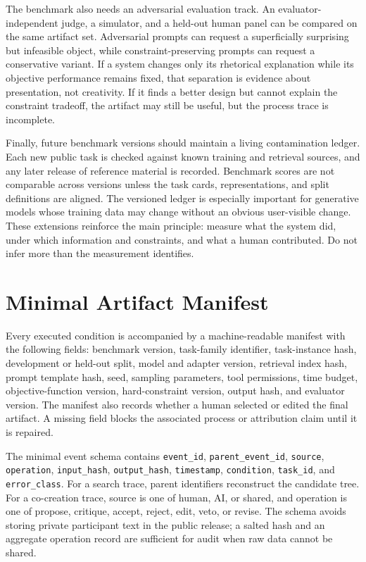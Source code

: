 \documentclass[conference]{IEEEtran}
\begin{document}
The benchmark also needs an adversarial evaluation track. An evaluator-independent
judge, a simulator, and a held-out human panel can be compared on the same artifact set.
Adversarial prompts can request a superficially surprising but infeasible object, while
constraint-preserving prompts can request a conservative variant. If a system changes
only its rhetorical explanation while its objective performance remains fixed, that
separation is evidence about presentation, not creativity. If it finds a better design
but cannot explain the constraint tradeoff, the artifact may still be useful, but the
process trace is incomplete.

Finally, future benchmark versions should maintain a living contamination ledger. Each
new public task is checked against known training and retrieval sources, and any later
release of reference material is recorded. Benchmark scores are not comparable across
versions unless the task cards, representations, and split definitions are aligned.
The versioned ledger is especially important for generative models whose training data
may change without an obvious user-visible change. These extensions reinforce the main
principle: measure what the system did, under which information and constraints, and
what a human contributed. Do not infer more than the measurement identifies.

\appendices
\section{Minimal Artifact Manifest}
\label{sec:appendix}

Every executed condition is accompanied by a machine-readable manifest with the
following fields: benchmark version, task-family identifier, task-instance hash,
development or held-out split, model and adapter version, retrieval index hash,
prompt template hash, seed, sampling parameters, tool permissions, time budget,
objective-function version, hard-constraint version, output hash, and evaluator version.
The manifest also records whether a human selected or edited the final artifact. A
missing field blocks the associated process or attribution claim until it is repaired.

The minimal event schema contains \texttt{event\_id}, \texttt{parent\_event\_id},
\texttt{source}, \texttt{operation}, \texttt{input\_hash}, \texttt{output\_hash},
\texttt{timestamp}, \texttt{condition}, \texttt{task\_id}, and \texttt{error\_class}.
For a search trace, parent identifiers reconstruct the candidate tree. For a
co-creation trace, source is one of human, AI, or shared, and operation is one of
propose, critique, accept, reject, edit, veto, or revise. The schema avoids storing
private participant text in the public release; a salted hash and an aggregate
operation record are sufficient for audit when raw data cannot be shared.
\end{document}

